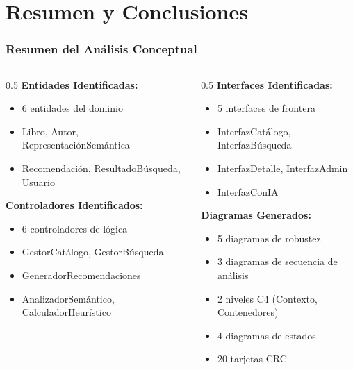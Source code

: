 \documentclass[aspectratio=169]{beamer}
\begin{document}
\section{Resumen y Conclusiones}

\begin{frame}
\frametitle{Resumen del Análisis Conceptual}

\begin{columns}
\begin{column}{0.5\textwidth}
\textbf{Entidades Identificadas:}
\begin{itemize}
\item 6 entidades del dominio
\item Libro, Autor, RepresentaciónSemántica
\item Recomendación, ResultadoBúsqueda, Usuario
\end{itemize}

\textbf{Controladores Identificados:}
\begin{itemize}
\item 6 controladores de lógica
\item GestorCatálogo, GestorBúsqueda
\item GeneradorRecomendaciones
\item AnalizadorSemántico, CalculadorHeurístico
\end{itemize}
\end{column}

\begin{column}{0.5\textwidth}
\textbf{Interfaces Identificadas:}
\begin{itemize}
\item 5 interfaces de frontera
\item InterfazCatálogo, InterfazBúsqueda
\item InterfazDetalle, InterfazAdmin
\item InterfazConIA
\end{itemize}

\textbf{Diagramas Generados:}
\begin{itemize}
\item 5 diagramas de robustez
\item 3 diagramas de secuencia de análisis
\item 2 niveles C4 (Contexto, Contenedores)
\item 4 diagramas de estados
\item 20 tarjetas CRC
\end{itemize}
\end{column}
\end{columns}

\end{frame}
\end{document}
